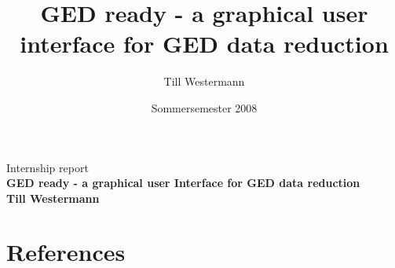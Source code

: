 \documentclass[german,a4paper,12pt,oneside]{paper}
\begin{document}



\title{\Huge GED ready - a graphical user interface for GED data reduction }
\author{Till Westermann}
\date{Sommersemester 2008}
\thispagestyle{empty}
\begin{center}
\Large Internship report \\  \vspace{3.0cm}
\Huge\sffamily\bfseries GED ready - a graphical user Interface for GED data reduction  \normalsize  \\ 
\vspace{10.0cm}
Till Westermann 
\end{center}

\newpage\thispagestyle{empty}



\tableofcontents
 \newpage\thispagestyle{plain}

\pagestyle{plain}
%
\clearpage\newpage
\setcounter{section}{0}

   
   
      

\section{References} 

\end{document}
